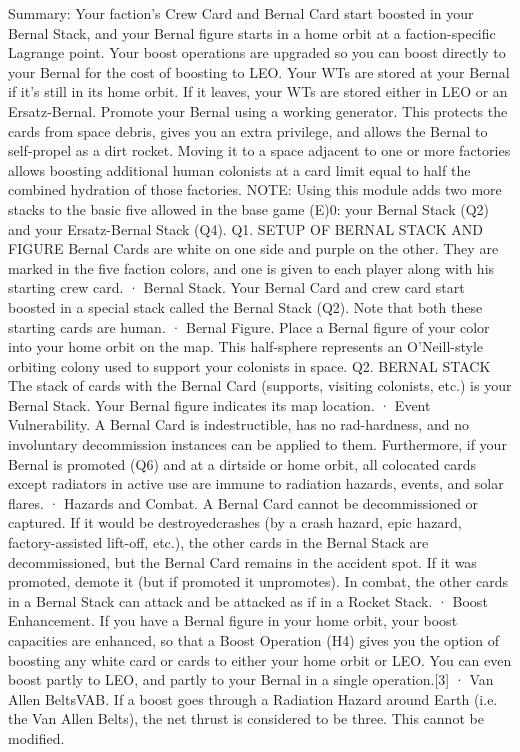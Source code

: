 \documentclass[a4paper]{book}
\begin{document}
Summary: Your faction’s Crew Card and Bernal Card start boosted in your Bernal Stack, and your Bernal figure starts in a home orbit at a faction-specific Lagrange point. Your boost operations are upgraded so you can boost directly to your Bernal for the cost of boosting to LEO. Your WTs are stored at your Bernal if it’s still in its home orbit. If it leaves, your WTs are stored either in LEO or an Ersatz-Bernal. Promote your Bernal using a working generator. This protects the cards from space debris, gives you an extra privilege, and allows the Bernal to self-propel as a dirt rocket. Moving it to a space adjacent to one or more factories allows boosting additional human colonists at a card limit equal to half the combined hydration of those factories.
NOTE: Using this module adds two more stacks to the basic five allowed in the base game (E)0: your Bernal Stack (Q2) and your Ersatz-Bernal Stack (Q4).
Q1. SETUP OF BERNAL STACK AND FIGURE
Bernal Cards are white on one side and purple on the other. They are marked in the five faction colors, and one is given to each player along with his starting crew card.
·       Bernal Stack. Your Bernal Card and crew card start boosted in a special stack called the Bernal Stack (Q2). Note that both these starting cards are human.
·       Bernal Figure. Place a Bernal figure of your color into your home orbit on the map. This half-sphere represents an O’Neill-style orbiting colony used to support your colonists in space.
Q2. BERNAL STACK
The stack of cards with the Bernal Card (supports, visiting colonists, etc.) is your Bernal Stack. Your Bernal figure indicates its map location.
·       Event Vulnerability. A Bernal Card is indestructible, has no rad-hardness, and no involuntary decommission instances can be applied to them. Furthermore, if your Bernal is promoted (Q6) and at a dirtside or home orbit, all colocated cards except radiators in active use are immune to radiation hazards, events, and solar flares.
·       Hazards and Combat. A Bernal Card cannot be decommissioned or captured. If it would be destroyedcrashes (by a crash hazard, epic hazard, factory-assisted lift-off, etc.), the other cards in the Bernal Stack are decommissioned, but the Bernal Card remains in the accident spot. If it was promoted, demote it (but if promoted it unpromotes). In combat, the other cards in a Bernal Stack can attack and be attacked as if in a Rocket Stack.
·       Boost Enhancement. If you have a Bernal figure in your home orbit, your boost capacities are enhanced, so that a Boost Operation (H4) gives you the option of boosting any white card or cards to either your home orbit or LEO. You can even boost partly to LEO, and partly to your Bernal in a single operation.[3]
·       Van Allen BeltsVAB. If a boost goes through a Radiation Hazard around Earth (i.e. the Van Allen Belts), the net thrust is considered to be three. This cannot be modified.
\end{document}
